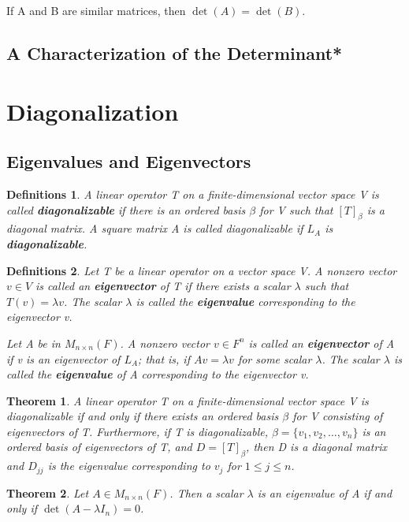 \documentclass{article}
\newcommand{\bd}[1]{\textbf{#1}}
\theoremstyle{plain}
\newtheorem{theorem}{Theorem}[section]
\newtheorem*{definitions}{Definitions}
\theoremstyle{plain} %
\begin{document}
If A and B are similar matrices, then $\det(A) = \det(B)$.

\subsection{A Characterization of the Determinant*}

\section{Diagonalization}

\subsection{Eigenvalues and Eigenvectors}

\begin{definitions}
  A linear operator T on a finite-dimensional vector space V is called \bd{diagonalizable} if there is an ordered basis $\beta$ for V such that $[T]_\beta$ is a diagonal matrix. A square matrix A is called diagonalizable if $L_A$ is \bd{diagonalizable}.
\end{definitions}

\begin{definitions}
  Let T be a linear operator on a vector space V. A nonzero vector $v \in V$ is called an \bd{eigenvector} of T if there exists a scalar $\lambda$ such that $T(v) = \lambda v$. The scalar $\lambda$ is called the \bd{eigenvalue} corresponding to the eigenvector v.

  Let A be in $M_{n\times n}(F)$. A nonzero vector $v \in F^n$ is called an \bd{eigenvector} of A if v is an eigenvector of $L_A$; that is, if $Av = \lambda v$ for some scalar $\lambda$. The scalar $\lambda$ is called the \bd{eigenvalue} of A corresponding to the eigenvector v.
\end{definitions}

\begin{theorem}
  A linear operator T on a finite-dimensional vector space V is diagonalizable if and only if there exists an ordered basis $\beta$ for V consisting of eigenvectors of T. Furthermore, if T is diagonalizable, $\beta = \{v_1, v_2,\ldots,v_n\}$ is an ordered basis of eigenvectors of T, and $D = [T]_\beta$, then D is a diagonal matrix and $D_{jj}$ is the eigenvalue corresponding to $v_j$ for $1 \leq j \leq n$.
\end{theorem}

\begin{theorem}
  Let $A \in M_{n\times n}(F)$. Then a scalar $\lambda$ is an eigenvalue of A if and only if $\det(A − \lambda I_n)=0$.
\end{theorem}
\end{document}
